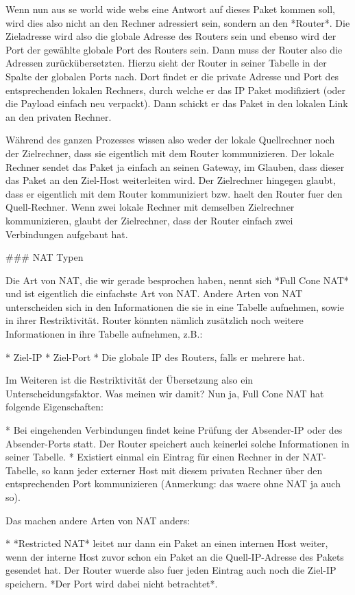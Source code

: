Wenn nun aus se world wide webs eine Antwort auf dieses Paket kommen soll, wird
dies also nicht an den Rechner adressiert sein, sondern an den *Router*. Die
Zieladresse wird also die globale Adresse des Routers sein und ebenso wird der
Port der gewählte globale Port des Routers sein. Dann muss der Router also die
Adressen zurückübersetzten. Hierzu sieht der Router in seiner Tabelle in der
Spalte der globalen Ports nach. Dort findet er die private Adresse und Port des
entsprechenden lokalen Rechners, durch welche er das IP Paket modifiziert (oder
die Payload einfach neu verpackt). Dann schickt er das Paket in den lokalen Link
an den privaten Rechner.

Während des ganzen Prozesses wissen also weder der lokale Quellrechner noch der
Zielrechner, dass sie eigentlich mit dem Router kommunizieren. Der lokale
Rechner sendet das Paket ja einfach an seinen Gateway, im Glauben, dass dieser
das Paket an den Ziel-Host weiterleiten wird. Der Zielrechner hingegen glaubt,
dass er eigentlich mit dem Router kommuniziert bzw. haelt den Router fuer den
Quell-Rechner. Wenn zwei lokale Rechner mit demselben Zielrechner kommunizieren,
glaubt der Zielrechner, dass der Router einfach zwei Verbindungen aufgebaut hat.

### NAT Typen

Die Art von NAT, die wir gerade besprochen haben, nennt sich *Full Cone NAT* und
ist eigentlich die einfachste Art von NAT. Andere Arten von NAT unterscheiden
sich in den Informationen die sie in eine Tabelle aufnehmen, sowie in ihrer
Restriktivität. Router könnten nämlich zusätzlich noch weitere Informationen in
ihre Tabelle aufnehmen, z.B.:

* Ziel-IP
* Ziel-Port
* Die globale IP des Routers, falls er mehrere hat.

Im Weiteren ist die Restriktivität der Übersetzung also ein
Unterscheidungsfaktor. Was meinen wir damit? Nun ja, Full Cone NAT hat folgende
Eigenschaften:

* Bei eingehenden Verbindungen findet keine Prüfung der Absender-IP oder des
  Absender-Ports statt. Der Router speichert auch keinerlei solche Informationen
  in seiner Tabelle.
* Existiert einmal ein Eintrag für einen Rechner in der NAT-Tabelle, so kann
  jeder externer Host mit diesem privaten Rechner über den entsprechenden Port
  kommunizieren (Anmerkung: das waere ohne NAT ja auch so).

Das machen andere Arten von NAT anders:

* *Restricted NAT* leitet nur dann ein Paket an einen internen Host weiter, wenn
  der interne Host zuvor schon ein Paket an die Quell-IP-Adresse des Pakets
  gesendet hat. Der Router wuerde also fuer jeden Eintrag auch noch die Ziel-IP
  speichern. *Der Port wird dabei nicht betrachtet*.

